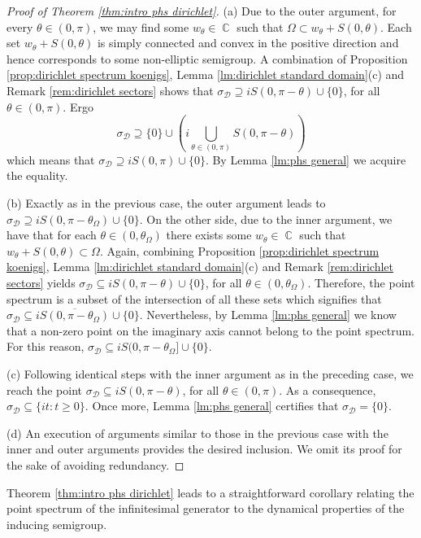 \documentclass[11pt]{amsart}
\numberwithin{equation}{section}
\theoremstyle{definition}
\DeclareMathOperator{\C}{\mathbb{C}}
\begin{document}
	
	\begin{proof}[Proof of Theorem \ref{thm:intro phs dirichlet}]
		(a) Due to the outer argument, for every $\theta\in(0,\pi)$, we may find some $w_\theta\in\C$ such that $\Omega\subset w_\theta+S(0,\theta)$. Each set $w_\theta+S(0,\theta)$ is simply connected and convex in the positive direction and hence corresponds to some non-elliptic semigroup. A combination of Proposition \ref{prop:dirichlet spectrum koenigs}, Lemma \ref{lm:dirichlet standard domain}(c) and Remark \ref{rem:dirichlet sectors} shows that $\sigma_\mathcal{D}\supseteq iS(0,\pi-\theta)\cup\{0\}$, for all $\theta\in(0,\pi)$. Ergo 
		$$\sigma_\mathcal{D}\supseteq \{0\} \cup \left(i\bigcup_{\theta\in(0,\pi)}S(0,\pi-\theta)\right)$$ which means that $\sigma_\mathcal{D}\supseteq iS(0,\pi)\cup\{0\}$. By Lemma \ref{lm:phs general} we acquire the equality.
		
		(b) Exactly as in the previous case, the outer argument leads to $\sigma_\mathcal{D}\supseteq iS(0,\pi-\theta_\Omega)\cup\{0\}$. On the other side, due to the inner argument, we have that for each $\theta\in(0,\theta_\Omega)$ there exists some $w_\theta\in\C$ such that $w_\theta+S(0,\theta)\subset\Omega$. Again, combining Proposition \ref{prop:dirichlet spectrum koenigs}, Lemma \ref{lm:dirichlet standard domain}(c) and Remark \ref{rem:dirichlet sectors} yields $\sigma_\mathcal{D}\subseteq iS(0,\pi-\theta)\cup\{0\}$, for all $\theta\in(0,\theta_\Omega)$. Therefore, the point spectrum is a subset of the intersection of all these sets which signifies that $\sigma_\mathcal{D}\subseteq i\overline{S(0,\pi-\theta_\Omega)}\cup\{0\}$. Nevertheless, by Lemma \ref{lm:phs general} we know that a non-zero point on the imaginary axis cannot belong to the point spectrum. For this reason, $\sigma_\mathcal{D}\subseteq iS(0,\pi-\theta_\Omega]\cup\{0\}$.
		
		(c) Following identical steps with the inner argument as in the preceding case, we reach the point $\sigma_\mathcal{D}\subseteq iS(0,\pi-\theta)$, for all $\theta\in(0,\pi)$. As a consequence, $\sigma_\mathcal{D}\subseteq\{it:t\ge0\}$. Once more, Lemma \ref{lm:phs general} certifies that $\sigma_\mathcal{D}=\{0\}$.
		
		(d) An execution of arguments similar to those in the previous case with the inner and outer arguments provides the desired inclusion. We omit its proof for the sake of avoiding redundancy.
	\end{proof}
	
	Theorem \ref{thm:intro phs dirichlet} leads to a straightforward corollary relating the point spectrum of the infinitesimal generator to the dynamical properties of the inducing semigroup.
	
\end{document}
